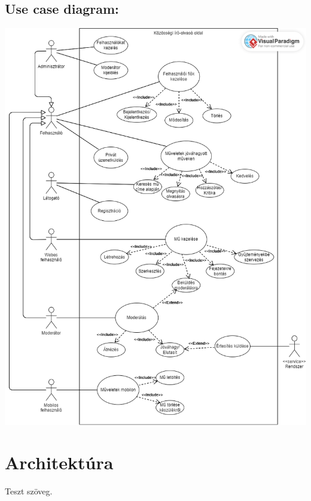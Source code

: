 \documentclass[12pt,a4paper,oneside]{article}
\begin{document}
\subsection{Use case diagram:}
\begin{center}
    \includegraphics[width=\textwidth,height=\textheight,keepaspectratio]{./figures/Use-case_diagram.png}
\end{center}


\section{Architektúra}
Teszt szöveg.\cite{wikipedia}



\newpage
\thispagestyle{empty}
{
    \footnotesize  %
    
    
}
\end{document}
